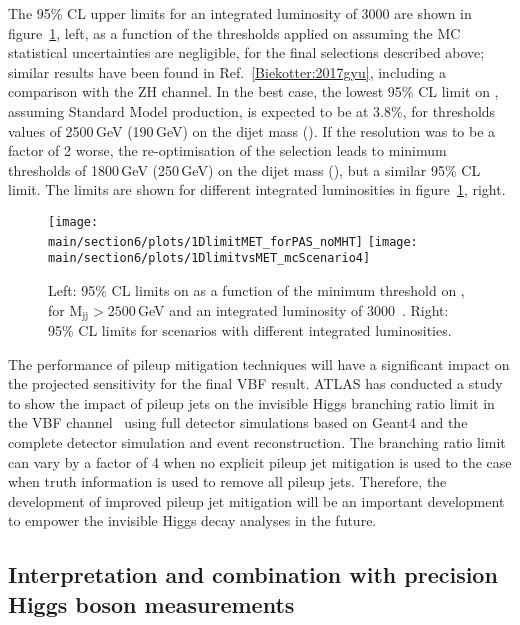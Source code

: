 \documentclass[../report.tex]{subfiles}
\providecommand{\main}{..}
\begin{document}
The 95\% CL upper limits for an integrated luminosity of 3000\fbinv
are shown in figure~\ref{fig:1Dlimits}, left, as a function of the
thresholds applied on \MET assuming the MC statistical uncertainties
are negligible, for the final selections described above; similar results have been found in Ref.~\ref{Biekotter:2017gyu}, including a comparison with the ZH channel. In the best
case, the lowest 95\% CL limit on \BHinv, assuming Standard Model
production, is expected to be at 3.8\%, for thresholds values of
2500\,GeV (190\,GeV) on the dijet mass (\MET). If the \MET resolution
was to be a factor of 2 worse, the re-optimisation of the selection
leads to minimum thresholds of 1800\,GeV (250\,GeV) on the dijet mass
(\MET), but a similar 95\% CL limit. The limits are shown for
different integrated luminosities in figure~\ref{fig:1Dlimits}, right.


\begin{figure}[htbp]
  \centering
    \texttt{[image: \\main/section6/plots/1DlimitMET\_forPAS\_noMHT]}
    \hfill
    \texttt{[image: \\main/section6/plots/1DlimitvsMET\_mcScenario4]}
\caption{Left: 95\% CL limits on \BHinv as a function of the minimum threshold on \MET, for M$_{\text{jj}}>2500$\,GeV and an integrated luminosity of 3000\fbinv ~\cite{CMS-PAS-FTR-18-016}. Right: 95\% CL limits for scenarios with different integrated luminosities.}
  \label{fig:1Dlimits}
\end{figure}


The performance of pileup mitigation techniques will have a significant impact on the projected sensitivity for the final VBF result. ATLAS has conducted a study to show the impact of pileup jets on the invisible Higgs branching ratio limit in the VBF channel~\cite{ATL-PHYS-PUB-2018-038} using full detector simulations based on Geant4\cite{Agostinelli:2002hh,Allison:2006ve} and the complete detector simulation and event reconstruction. The branching ratio limit can vary by a factor of 4 when no explicit pileup jet mitigation is used to the case when truth information is used to remove all pileup jets. Therefore, the development of improved pileup jet mitigation will be an important development to empower the invisible Higgs decay analyses in the future.





\subsection{Interpretation and combination with precision Higgs boson measurements}
\end{document}
